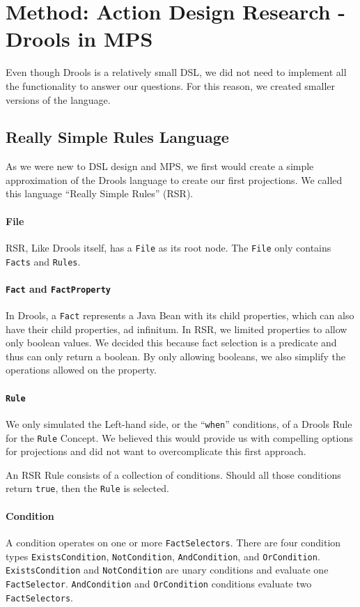 \section{Method: Action Design Research - Drools in MPS}
\label{section:Method_action_research}

Even though Drools is a relatively small DSL, we did not need to implement all the functionality to answer our questions.
For this reason, we created smaller versions of the language.

\subsection{Really Simple Rules Language}
As we were new to DSL design and MPS, we first would create a simple approximation of the Drools language to create our first projections.
We called this language ``Really Simple Rules'' (RSR).

\paragraph{File} RSR, Like Drools itself, has a \texttt{File} as its root node.
The \texttt{File} only contains \texttt{Facts} and \texttt{Rules}.

\paragraph{\texttt{Fact} and \texttt{FactProperty}} In Drools, a \texttt{Fact} represents a Java Bean with its child properties, which can also have their child properties, ad infinitum.
In RSR, we limited properties to allow only boolean values.
We decided this because fact selection is a predicate and thus can only return a boolean.
By only allowing booleans, we also simplify the operations allowed on the property.

\paragraph{\texttt{Rule}} We only simulated the Left-hand side, or the ``\texttt{when}'' conditions, of a Drools Rule for the \texttt{Rule} Concept.
We believed this would provide us with compelling options for projections and did not want to overcomplicate this first approach.

An RSR Rule consists of a collection of conditions.
Should all those conditions return \texttt{true}, then the \texttt{Rule} is selected.

\paragraph{Condition} A condition operates on one or more \texttt{FactSelectors}.
There are four condition types \texttt{ExistsCondition}, \texttt{NotCondition}, \texttt{AndCondition}, and \texttt{OrCondition}.
\texttt{ExistsCondition} and \texttt{NotCondition} are unary conditions and evaluate one \texttt{FactSelector}.
\texttt{AndCondition} and \texttt{OrCondition} conditions evaluate two \texttt{FactSelectors}.

